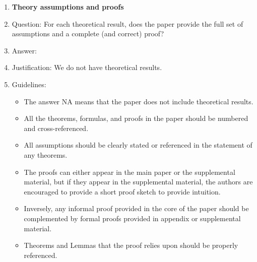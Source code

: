 \documentclass{article}
\begin{document}
\begin{enumerate}
\item {\bf Theory assumptions and proofs}
    \item[] Question: For each theoretical result, does the paper provide the full set of assumptions and a complete (and correct) proof?
    \item[] Answer: \answerNA{} %
    \item[] Justification: We do not have theoretical results.
    \item[] Guidelines:
    \begin{itemize}
        \item The answer NA means that the paper does not include theoretical results. 
        \item All the theorems, formulas, and proofs in the paper should be numbered and cross-referenced.
        \item All assumptions should be clearly stated or referenced in the statement of any theorems.
        \item The proofs can either appear in the main paper or the supplemental material, but if they appear in the supplemental material, the authors are encouraged to provide a short proof sketch to provide intuition. 
        \item Inversely, any informal proof provided in the core of the paper should be complemented by formal proofs provided in appendix or supplemental material.
        \item Theorems and Lemmas that the proof relies upon should be properly referenced. 
    \end{itemize}


\end{enumerate}
\end{document}

